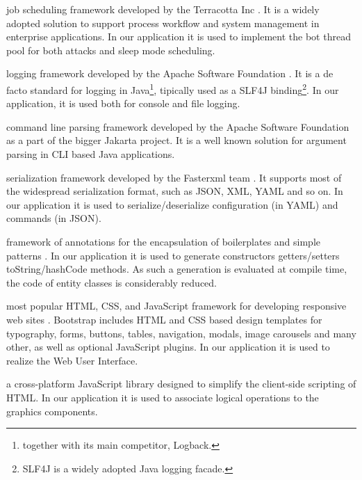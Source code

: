 \begin{description}
  \setlength\itemsep{1em}

  \item[QUARTZ] job scheduling framework developed by the Terracotta Inc \cite{quartz-scheduler}.
  It is a widely adopted solution to support process workflow and system management in enterprise applications.
  In our application it is used to implement the bot thread pool for both attacks and sleep mode scheduling.

  \item[LOG4J2] logging framework developed by the Apache Software Foundation \cite{log4j2}.
  It is a de facto standard for logging in Java\footnote{together with its main competitor, Logback.}, tipically used as a SLF4J binding\footnote{SLF4J is a widely adopted Java logging facade.}.
  In our application, it is used both for console and file logging.

  \item[COMMONS CLI] command line parsing framework developed by the Apache Software Foundation as a part of the bigger Jakarta project\cite{commons-cli}.
  It is a well known solution for argument parsing in CLI based Java applications.

  \item[JACKSON] serialization framework developed by the Fasterxml team \cite{jackson}.
  It supports most of the widespread serialization format, such as JSON, XML, YAML and so on.
  In our application it is used to serialize/deserialize configuration (in YAML) and commands (in JSON).

  \item[LOMBOK] framework of annotations for the encapsulation of boilerplates and simple patterns \cite{lombok}.
  In our application it is used to generate constructors getters/setters toString/hashCode methods. As such a generation is evaluated at compile time, the code of entity classes is considerably reduced.

  \item[BOOTSTRAP] most popular HTML, CSS, and JavaScript framework for developing responsive web sites \cite{bootstrap}. Bootstrap includes HTML and CSS based design templates for typography, forms, buttons, tables, navigation, modals, image carousels and many other, as well as optional JavaScript plugins. In our application it is used to realize the Web User Interface.

  \item[JQUERY] a cross-platform JavaScript library designed to simplify the client-side scripting of HTML\cite{jquery}. In our application it is used to associate logical operations to the graphics components.

\end{description}


